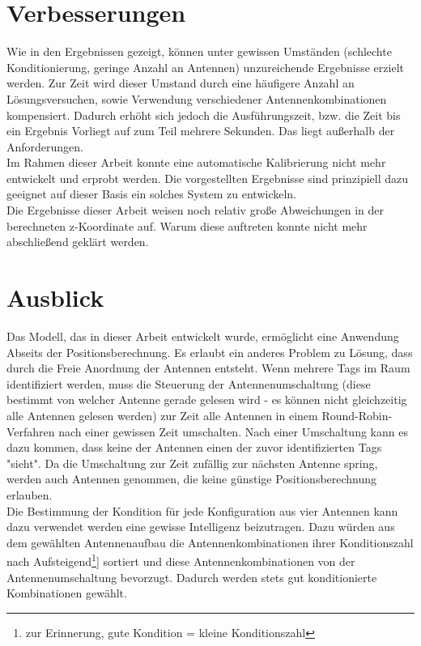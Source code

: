 %
\section{Verbesserungen}
%
Wie in den Ergebnissen gezeigt, können unter gewissen Umständen (schlechte Konditionierung, geringe Anzahl an Antennen) unzureichende Ergebnisse erzielt werden. Zur Zeit wird dieser Umstand durch eine häufigere Anzahl an Lösungsversuchen, sowie Verwendung verschiedener Antennenkombinationen kompensiert. Dadurch erhöht sich jedoch die Ausführungszeit, bzw. die Zeit bis ein Ergebnis Vorliegt auf zum Teil mehrere Sekunden. Das liegt außerhalb der Anforderungen. \\
%
Im Rahmen dieser Arbeit konnte eine automatische Kalibrierung nicht mehr entwickelt und erprobt werden. Die vorgestellten Ergebnisse sind prinzipiell dazu geeignet auf dieser Basis ein solches System zu entwickeln.\\


Die Ergebnisse dieser Arbeit weisen noch relativ große Abweichungen in der berechneten z-Koordinate auf. Warum diese auftreten konnte nicht mehr abschließend geklärt werden.

%
\section{Ausblick}
\label{sec:Calibration_Optimaztion}
%
Das Modell, das in dieser Arbeit entwickelt wurde, ermöglicht eine Anwendung Abseits der Positionsberechnung. Es erlaubt ein anderes Problem zu Lösung, dass durch die Freie Anordnung der Antennen entsteht. Wenn mehrere Tags im Raum identifiziert werden, muss die Steuerung der Antennenumschaltung (diese bestimmt von welcher Antenne gerade gelesen wird - es können nicht gleichzeitig alle Antennen gelesen werden) zur Zeit alle Antennen in einem Round-Robin-Verfahren nach einer gewissen Zeit umschalten. Nach einer Umschaltung kann es dazu kommen, dass keine der Antennen einen der zuvor identifizierten Tags "sieht". Da die Umschaltung zur Zeit zufällig zur nächsten Antenne spring, werden auch Antennen genommen, die keine günstige Positionsberechnung erlauben.\\
Die Bestimmung der Kondition für jede Konfiguration aus vier Antennen kann dazu verwendet werden eine gewisse Intelligenz beizutragen. Dazu würden aus dem gewählten Antennenaufbau die Antennenkombinationen ihrer Konditionszahl nach Aufsteigend\footnote{zur Erinnerung, gute Kondition = kleine Konditionszahl}] sortiert und diese Antennenkombinationen von der Antennenumschaltung bevorzugt. Dadurch werden stets gut konditionierte Kombinationen gewählt.